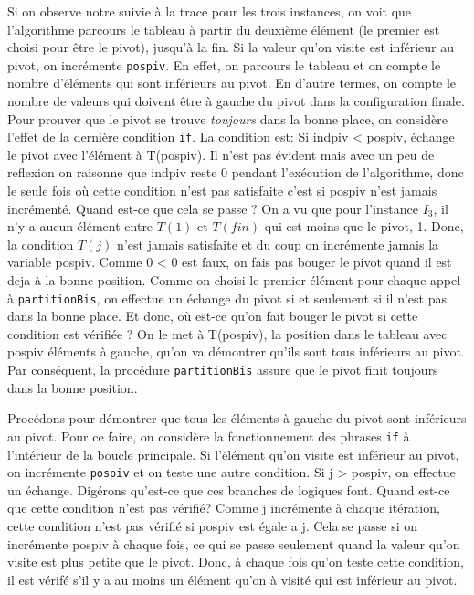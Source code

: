 \documentclass[10pt]{article} %
\begin{document}
Si on observe notre suivie à la trace pour les trois instances, on voit que l'algorithme parcours le tableau à partir du deuxième élément (le premier est choisi pour être le pivot),
jusqu'à la fin. Si la valeur qu'on visite est inférieur au pivot, on incrémente \texttt{pospiv}. En effet, on parcours le tableau et on compte le nombre d'éléments qui sont inférieurs au pivot.
En d'autre termes, on compte le nombre de valeurs qui doivent être à gauche du pivot dans la configuration finale. Pour prouver que le pivot se trouve \textit{toujours} dans la bonne place, on considère
l'effet de la dernière condition \texttt{if}. La condition est: Si indpiv < pospiv, échange le pivot avec l'élément à T(pospiv). Il n'est pas évident mais avec un peu de reflexion on raisonne que indpiv
reste 0 pendant l'exécution de l'algorithme, donc le seule fois où cette condition n'est pas satisfaite c'est si pospiv n'est jamais incrémenté. Quand est-ce que cela se passe ? On a vu que pour l'instance
$I_3$, il n'y a aucun élément entre $T(1)$ et $T(fin)$ qui est moins que le pivot, 1. Donc, la condition $T(j)$ n'est jamais satisfaite et du coup on incrémente jamais la variable pospiv.
Comme 0 < 0 est faux, on fais pas bouger le pivot quand il est deja à la bonne position. Comme on choisi le premier élément pour chaque appel à \texttt{partitionBis}, on effectue un échange du pivot si et seulement si
il n'est pas dans la bonne place. Et donc, où est-ce qu'on fait bouger le pivot si cette condition est vérifiée ? On le met à T(pospiv), la position dans le tableau avec pospiv éléments à gauche, qu'on va démontrer qu'ils sont
tous inférieurs au pivot. Par conséquent, la procédure \texttt{partitionBis} assure que le pivot finit toujours dans la bonne position.

Procédons pour démontrer que tous les éléments à gauche du pivot sont inférieurs au pivot. Pour ce faire, on considère la fonctionnement des phrases \texttt{if}
à l'intérieur de la boucle principale. Si l'élément qu'on visite est inférieur au pivot, on incrémente \texttt{pospiv} et on teste une autre condition. Si j > pospiv,
on effectue un échange. Digérons qu'est-ce que ces branches de logiques font. Quand est-ce que cette condition n'est pas vérifié? Comme j incrémente à chaque itération,
cette condition n'est pas vérifié si pospiv est égale a j. Cela se passe si on incrémente pospiv à chaque fois, ce qui se passe seulement quand la valeur qu'on visite est plus petite
que le pivot. Donc, à chaque fois qu'on teste cette condition, il est vérifé s'il y a au moins un élément qu'on à visité qui est inférieur au pivot.
\end{document}

